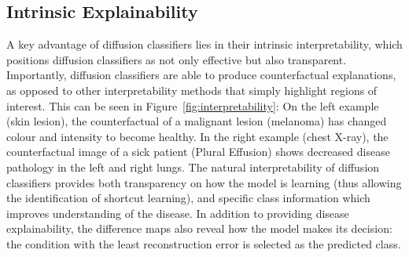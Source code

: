 \subsection{Intrinsic Explainability}%

\begin{comment}
    A key advantage of diffusion classifiers lies in their inherent interpretability. Unlike discriminative classifiers, which require techniques such as GradCAM~\cite{gradcam} or classifier-guidance~\cite{dhariwal2021diffusionmodelsbeatgans} with a separate generative model to provide indirect insights into their decision-making process, diffusion classifiers offer a unique paradigm: while their classification is indirect, their explanations are direct. This duality positions diffusion classifiers as not only effective but also transparent; an elegant solution to the challenge of interpretability in deep learning. We show examples of this feature of diffusion classifiers in Figure~\ref{fig:interpretability}.
\end{comment}

A key advantage of diffusion classifiers lies in their intrinsic interpretability, which positions diffusion classifiers as not only effective but also transparent. Importantly, diffusion classifiers are able to produce counterfactual explanations, as opposed to other interpretability methods that simply highlight regions of interest. This can be seen in Figure~\ref{fig:interpretability}: On the left example (skin lesion), the counterfactual of a malignant lesion (melanoma) has changed colour and intensity to become healthy. In the right example (chest X-ray), the counterfactual image of a sick patient (Plural Effusion) shows decreased disease pathology in the left and right lungs. The natural interpretability of diffusion classifiers provides both transparency on how the model is learning (thus allowing the identification of shortcut learning), and specific class information which improves understanding of the disease. In addition to providing disease explainability, the difference maps also reveal how the model makes its decision: the condition with the least reconstruction error is selected as the predicted class. %

